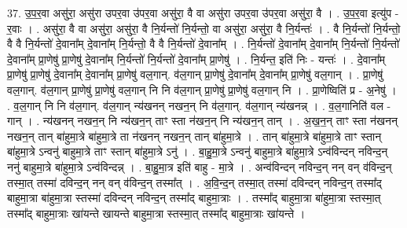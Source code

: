 \documentclass[17pt]{extarticle}
\begin{document}
37. उ॒प॒र॒वा असु॑रा॒ असु॑रा उपर॒वा उ॑पर॒वा असु॑रा॒ वै वा असु॑रा उपर॒वा उ॑पर॒वा असु॑रा॒ वै । . उ॒प॒र॒वा इत्यु॑प - र॒वाः । . असु॑रा॒ वै वा असु॑रा॒ असु॑रा॒ वै नि॒र्यन्तो॑ नि॒र्यन्तो॒ वा असु॑रा॒ असु॑रा॒ वै नि॒र्यन्तः॑ । . वै नि॒र्यन्तो॑ नि॒र्यन्तो॒ वै वै नि॒र्यन्तो॑ दे॒वाना᳚म् दे॒वाना᳚म् नि॒र्यन्तो॒ वै वै नि॒र्यन्तो॑ दे॒वाना᳚म् । . नि॒र्यन्तो॑ दे॒वाना᳚म् दे॒वाना᳚म् नि॒र्यन्तो॑ नि॒र्यन्तो॑ दे॒वाना᳚म् प्रा॒णेषु॑ प्रा॒णेषु॑ दे॒वाना᳚म् नि॒र्यन्तो॑ नि॒र्यन्तो॑ दे॒वाना᳚म् प्रा॒णेषु॑ । . नि॒र्यन्त॒ इति॑ निः - यन्तः॑ । . दे॒वाना᳚म् प्रा॒णेषु॑ प्रा॒णेषु॑ दे॒वाना᳚म् दे॒वाना᳚म् प्रा॒णेषु॑ वल॒गान्. व॑ल॒गान् प्रा॒णेषु॑ दे॒वाना᳚म् दे॒वाना᳚म् प्रा॒णेषु॑ वल॒गान् । . प्रा॒णेषु॑ वल॒गान्. व॑ल॒गान् प्रा॒णेषु॑ प्रा॒णेषु॑ वल॒गान् नि नि व॑ल॒गान् प्रा॒णेषु॑ प्रा॒णेषु॑ वल॒गान् नि । . प्रा॒णेष्विति॑ प्र - अ॒नेषु॑ । . व॒ल॒गान् नि नि व॑ल॒गान्. व॑ल॒गान् न्य॑खनन् नखन॒न् नि व॑ल॒गान्. व॑ल॒गान् न्य॑खनन्न् । . व॒ल॒गानिति॑ वल - गान् । . न्य॑खनन् नखन॒न् नि न्य॑खन॒न् ताꣳ स्ता न॑खन॒न् नि न्य॑खन॒न् तान् । . अ॒ख॒न॒न् ताꣳ स्ता न॑खनन् नखन॒न् तान् बा॑हुमा॒त्रे बा॑हुमा॒त्रे ता न॑खनन् नखन॒न् तान् बा॑हुमा॒त्रे । . तान् बा॑हुमा॒त्रे बा॑हुमा॒त्रे ताꣳ स्तान् बा॑हुमा॒त्रे ऽन्वनु॑ बाहुमा॒त्रे ताꣳ स्तान् बा॑हुमा॒त्रे ऽनु॑ । . बा॒हु॒मा॒त्रे ऽन्वनु॑ बाहुमा॒त्रे बा॑हुमा॒त्रे ऽन्व॑विन्दन् नविन्द॒न् ननु॑ बाहुमा॒त्रे बा॑हुमा॒त्रे ऽन्व॑विन्दन्न् । . बा॒हु॒मा॒त्र इति॑ बाहु - मा॒त्रे । . अन्व॑विन्दन् नविन्द॒न् नन् वन् व॑विन्द॒न् तस्मा॒त् तस्मा॑ दविन्द॒न् नन् वन् व॑विन्द॒न् तस्मा᳚त् । . अ॒वि॒न्द॒न् तस्मा॒त् तस्मा॑ दविन्दन् नविन्द॒न् तस्मा᳚द् बाहुमा॒त्रा बा॑हुमा॒त्रा स्तस्मा॑ दविन्दन् नविन्द॒न् तस्मा᳚द् बाहुमा॒त्राः । . तस्मा᳚द् बाहुमा॒त्रा बा॑हुमा॒त्रा स्तस्मा॒त् तस्मा᳚द् बाहुमा॒त्राः खा॑यन्ते खायन्ते बाहुमा॒त्रा स्तस्मा॒त् तस्मा᳚द् बाहुमा॒त्राः खा॑यन्ते । \newline
\end{document}
